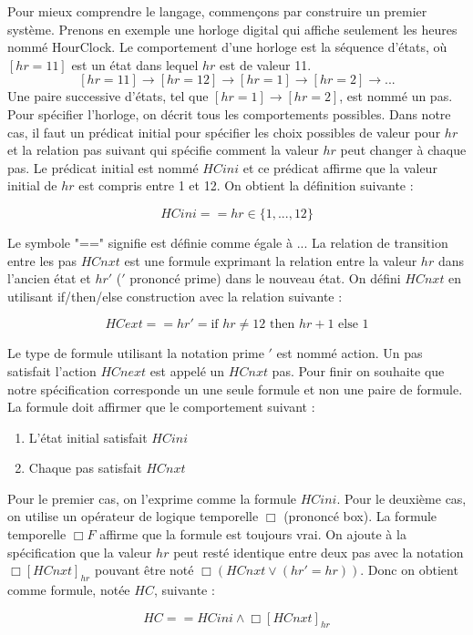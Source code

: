 \documentclass[12pt,a4paper]{article}
\begin{document}
Pour mieux comprendre le langage, commençons par construire un premier système. Prenons en exemple une horloge digital qui affiche seulement les heures nommé HourClock. Le comportement d'une horloge est la séquence d'états, où $[hr = 11]$ est un état dans lequel $ hr $ est de valeur 11.
$$ [hr = 11] \rightarrow [hr = 12] \rightarrow [hr = 1] \rightarrow [hr = 2] \rightarrow ...$$
Une paire successive d'états, tel que $[hr = 1] \rightarrow [hr = 2]$, est nommé un pas.
Pour spécifier l'horloge, on décrit tous les comportements possibles. Dans notre cas, il faut un prédicat initial pour spécifier les choix possibles de valeur pour $hr$ et la relation pas suivant qui spécifie comment la valeur $hr$ peut changer à chaque pas.
Le prédicat initial est nommé $HCini$ et ce prédicat affirme que la valeur initial de $hr$ est compris entre 1 et 12. On obtient la définition suivante :

$$ HCini == hr \in \{1,...,12\}$$

Le symbole "==" signifie est définie comme égale à ... 
La relation de transition entre les pas $HCnxt$ est une formule exprimant la relation entre la valeur $hr$ dans l'ancien état et $hr'$ ($'$ prononcé prime) dans le nouveau état. On défini $HCnxt$ en utilisant if/then/else construction avec la relation suivante :   

$$ HCext == hr' = \text{if } hr \neq 12 \text{ then } hr + 1 \text{ else } 1 $$

Le type de formule utilisant la notation prime $'$ est nommé action. Un pas satisfait l'action $HCnext$ est appelé un $HCnxt$ pas.
Pour finir on souhaite que notre spécification corresponde un une seule formule et non une paire de formule. La formule doit affirmer que le comportement suivant :
\begin{enumerate}
	\item L'état initial satisfait $HCini$
	\item Chaque pas satisfait $HCnxt$
\end{enumerate}
Pour le premier cas, on l'exprime comme la formule $HCini$. Pour le deuxième cas, on utilise un opérateur de logique temporelle $\Box$ (prononcé box). La formule temporelle $\Box F$ affirme que la formule est toujours vrai. On ajoute à la spécification que la valeur $hr$ peut resté identique entre deux pas avec la notation $\Box [HCnxt]_{hr}$ pouvant être noté $\Box (HCnxt \lor (hr' = hr ))$. Donc on obtient comme formule, notée $HC$, suivante :

$$ HC == HCini  \land  \Box [HCnxt]_{hr} $$
\end{document}
